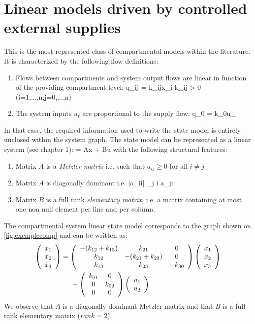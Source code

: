 \section{Linear models driven by controlled external supplies}

This is the most represented class of compartmental models within the literature.
It is characterized by the following flow definitions:
\begin{enumerate}
\item Flows between compartments and system output flows  are linear in function of the providing compartment level:
\eqnn
q_{ij} = k_{ij}x_i \hspace{1cm} k_{ij} > 0 \hspace{1cm} (i=1,...,n;j=0,...,n)
\eeqnn
\item The system inputs $u_{\ell}$ are proportional to the supply flow: 
\eqnn
q_{0\ell} = k_{0\ell}u_{\ell} 
\eeqnn
\end{enumerate}

In that case, the required information used to write the state model is entirely unclosed within the system graph.
The state model can be represented as a linear system (see chapter 1):
\eqnn
{} = Ax + Bu
\eeqnn
with the following structural features:
\begin{enumerate}
\item Matrix $A$ is a {\em Metzler matrix} i.e. such that $a_{ij} \geq 0$ for all $i \neq j$
\item Matrix $A$ is diagonally dominant i.e.
\eqnn |a_{ii}| \geq \sum_{j \neq i} a_{ji} 
\eeqnn
\item Matrix $B$ is a full rank {\em elementary matrix}, i.e. a matrix containing at most one non null element per line and per column.
\end{enumerate}

\begin{exemple}
The compartmental system linear state model corresponds to the graph shown on \ref{fig:exemplecomp} 
and can be written as:
\begin{equation} \begin{split}
\bma{c} \dot x_1 \\ \dot x_2 \\ \dot x_3 \ema &= 
\bma{ccc} -(k_{12} + k_{13}) & k_{21} & 0 \\ 
k_{12} & -(k_{21} + k_{23}) & 0 \\ k_{13} & k_{23} & - k_{30} \ema
\bma{c} x_1 \\ x_2 \\ x_3 \ema \\ &\hd
+ \bma{cc} k_{01} & 0 \\ 0 & k_{02} \\ 0 & 0 \ema
\bma{c} u_1 \\ u_2 \ema
\end{split} \end{equation}
We observe that $A$ is a diagonally dominant Metzler matrix and that $B$ is a full rank elementary matrix ($rank = 2$).
\cqfd
\end{exemple}

